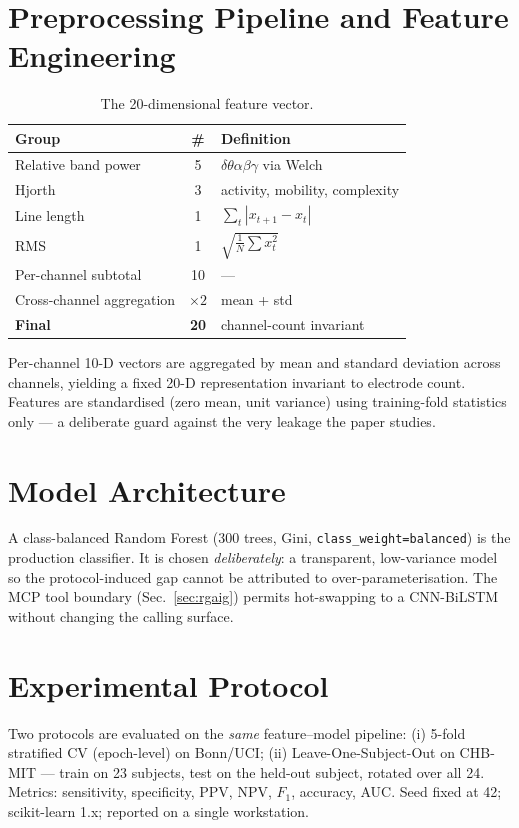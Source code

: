 \documentclass[10pt,journal,twocolumn]{IEEEtran}
\begin{document}
\section{Preprocessing Pipeline and Feature Engineering}\label{sec:feat}
\begin{table}[h]\centering\caption{The 20-dimensional feature vector.}\label{tab:feat}
\begin{tabular}{lcl}\toprule
Group & \# & Definition\\\midrule
Relative band power & 5 & $\delta\theta\alpha\beta\gamma$ via Welch\\
Hjorth & 3 & activity, mobility, complexity\\
Line length & 1 & $\sum_t|x_{t+1}-x_t|$\\
RMS & 1 & $\sqrt{\frac1N\sum x_t^2}$\\\midrule
Per-channel subtotal & 10 & ---\\
Cross-channel aggregation & $\times2$ & mean + std\\\midrule
\textbf{Final} & \textbf{20} & channel-count invariant\\\bottomrule
\end{tabular}\end{table}
Per-channel 10-D vectors are aggregated by mean and standard deviation across channels, yielding a fixed 20-D representation invariant to electrode count. Features are standardised (zero mean, unit variance) using training-fold statistics only --- a deliberate guard against the very leakage the paper studies.

\section{Model Architecture}
A class-balanced Random Forest (300 trees, Gini, \texttt{class\_weight=balanced}) is the production classifier. It is chosen \emph{deliberately}: a transparent, low-variance model so the protocol-induced gap cannot be attributed to over-parameterisation. The MCP tool boundary (Sec.~\ref{sec:rgaig}) permits hot-swapping to a CNN-BiLSTM without changing the calling surface.

\section{Experimental Protocol}
Two protocols are evaluated on the \emph{same} feature--model pipeline: (i) 5-fold stratified CV (epoch-level) on Bonn/UCI; (ii) Leave-One-Subject-Out on CHB-MIT --- train on 23 subjects, test on the held-out subject, rotated over all 24. Metrics: sensitivity, specificity, PPV, NPV, $F_1$, accuracy, AUC. Seed fixed at 42; scikit-learn 1.x; reported on a single workstation.
\end{document}
